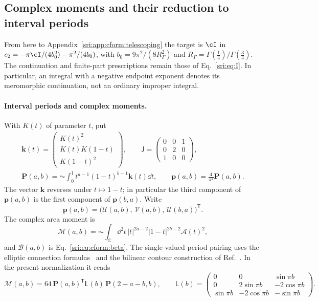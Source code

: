 \subsection{Complex moments and their reduction to interval periods}\label{sri:app:cform:moments}
From here to Appendix~\ref{sri:app:cform:telescoping} the target is $\cI$ in
$c_2=-\pi\cI/(4b_0^2)-\pi^2/(4b_0)$, with $b_0=9\pi^2/(8R_\Gamma^2)$ and $R_\Gamma=\Gamma(\frac14)/\Gamma(\frac34)$. The
continuation and finite-part prescriptions remain those of Eq.~\eqref{sri:eq:I}. In particular, an integral with a negative
endpoint exponent denotes its meromorphic continuation, not an ordinary improper integral.

\paragraph{Interval periods and complex moments.} With $K(t)$ of parameter $t$, put
\begin{equation}
\begin{gathered}
 \mathbf k(t)=\begin{pmatrix}K(t)^2\\K(t)K(1-t)\\K(1-t)^2\end{pmatrix},\qquad
 \mathsf J=\begin{pmatrix}0&0&1\\0&2&0\\1&0&0\end{pmatrix},\\
 \mathbf P(a,b)=\AC\!\int_0^1t^{a-1}(1-t)^{b-1}\mathbf k(t)\dd t,\qquad
 \mathbf p(a,b)=\frac4{\pi^2}\mathbf P(a,b).
\end{gathered}
 \label{sri:eq:cform:periods}
\end{equation}
The vector $\mathbf k$ reverses under $t\mapsto1-t$; in particular the third component of $\mathbf p(a,b)$ is the first
component of $\mathbf p(b,a)$. Write
\begin{equation}
 \mathbf p(a,b)=\bigl(\mathcal U(a,b),\,\mathcal V(a,b),\,\mathcal U(b,a)\bigr)^{\mathsf T}.
\end{equation}
The complex area moment is
\begin{equation}
 \mathcal M(a,b)=\AC\!\int_{\mathbb C}\dd^2t\,|t|^{2a-2}|1-t|^{2b-2}\mathcal A(t)^2,
\end{equation}
and $\mathcal B(a,b)$ is Eq.~\eqref{sri:eq:cform:beta}. The single-valued period pairing uses the elliptic connection
formulas~\cite{sri:NIST:DLMF} and the bilinear contour construction of Ref.~\cite{sri:Duhr:2023}. In the present
normalization it reads
\begin{equation}
 \mathcal M(a,b)=64\,\mathbf P(a,b)^{\mathsf T}\mathsf L(b)\,\mathbf P(2-a-b,b),\qquad
 \mathsf L(b)=\begin{pmatrix}0&0&\sin\pi b\\0&2\sin\pi b&-2\cos\pi b\\\sin\pi b&-2\cos\pi b&-\sin\pi b\end{pmatrix}.
 \label{sri:eq:cform:pairing}
\end{equation}

